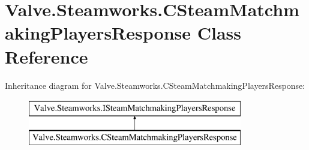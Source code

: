 \hypertarget{classValve_1_1Steamworks_1_1CSteamMatchmakingPlayersResponse}{}\section{Valve.\+Steamworks.\+C\+Steam\+Matchmaking\+Players\+Response Class Reference}
\label{classValve_1_1Steamworks_1_1CSteamMatchmakingPlayersResponse}
Inheritance diagram for Valve.\+Steamworks.\+C\+Steam\+Matchmaking\+Players\+Response\+:\begin{figure}[H]
\begin{center}
\leavevmode
\includegraphics[height=2.000000cm]{classValve_1_1Steamworks_1_1CSteamMatchmakingPlayersResponse}
\end{center}
\end{figure}
